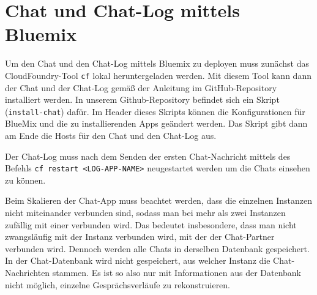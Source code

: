 \section{Chat und Chat-Log mittels Bluemix}

Um den Chat und den Chat-Log mittels Bluemix zu deployen muss zunächst das CloudFoundry-Tool \verb|cf| lokal heruntergeladen werden. Mit diesem Tool kann dann der Chat und der Chat-Log gemäß der Anleitung im GitHub-Repository installiert werden. In unserem Github-Repository befindet sich ein Skript (\verb|install-chat|) dafür. Im Header dieses Skripts können die Konfigurationen für BlueMix und die zu installierenden Apps geändert werden. Das Skript gibt dann am Ende die Hosts für den Chat und den Chat-Log aus.

Der Chat-Log muss nach dem Senden der ersten Chat-Nachricht mittels des Befehls \verb|cf restart <LOG-APP-NAME>| neugestartet werden um die Chats einsehen zu können.

Beim Skalieren der Chat-App muss beachtet werden, dass die einzelnen Instanzen nicht miteinander verbunden sind, sodass man bei mehr als zwei Instanzen zufällig mit einer verbunden wird. Das bedeutet insbesondere, dass man nicht zwangsläufig mit der Instanz verbunden wird, mit der der Chat-Partner verbunden wird. Dennoch werden alle Chats in derselben Datenbank gespeichert. In der Chat-Datenbank wird nicht gespeichert, aus welcher Instanz die Chat-Nachrichten stammen. Es ist so also nur mit Informationen aus der Datenbank nicht möglich, einzelne Gesprächsverläufe zu rekonstruieren.
